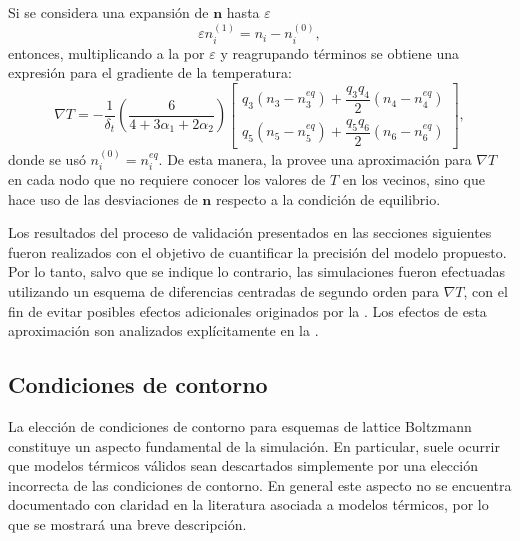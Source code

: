 Si se considera una expansi\'on de $\bm{n}$ hasta $\varepsilon$
\begin{equation}
	\varepsilon n_i^{(1)} = n_i - n_i^{(0)},
\end{equation}
entonces, multiplicando a la  por $\varepsilon$ y reagrupando t\'erminos se obtiene una expresi\'on para el gradiente de la temperatura:
\begin{equation}
	\nabla T= -\dfrac{1}{\delta_t}\left( \dfrac{6}{4+3\alpha_1+2\alpha_2} \right)
	\left[ 
 	\begin{array}{c} 
 		q_3 (n_3 - n_3^{eq})  +  \dfrac{q_3q_4}{2} (n_4 - n_4^{eq}) \\[2mm]
 		q_5 (n_5 - n_5^{eq})  +  \dfrac{q_5q_6}{2} (n_6 - n_6^{eq})
 	\end{array} 
	\right],
	\label{eq:gradT_2d}
\end{equation}
donde se us\'o $n_i^{(0)} = n_i^{eq}$. De esta manera, la  provee una aproximaci\'on para $\nabla T$ en cada nodo que no requiere conocer los valores de $T$ en los vecinos, sino que hace uso de las desviaciones de $\bm{n}$ respecto a la condici\'on de equilibrio.

Los resultados del proceso de validaci\'on presentados en las secciones siguientes fueron realizados con el objetivo de cuantificar la precisi\'on del modelo propuesto. Por lo tanto, salvo que se indique lo contrario, las simulaciones fueron efectuadas utilizando un esquema de diferencias centradas de segundo orden para $\nabla T$, con el fin de evitar posibles efectos adicionales originados por la . Los efectos de esta aproximaci\'on son analizados expl\'icitamente en la .



\subsection{Condiciones de contorno}

La elecci\'on de condiciones de contorno para esquemas de lattice Boltzmann constituye un aspecto fundamental de la simulaci\'on. En particular, suele ocurrir que modelos t\'ermicos v\'alidos sean descartados simplemente por una elecci\'on incorrecta de las condiciones de contorno. En general este aspecto no se encuentra documentado con claridad en la literatura asociada a modelos t\'ermicos, por lo que se mostrar\'a una breve descripci\'on.

